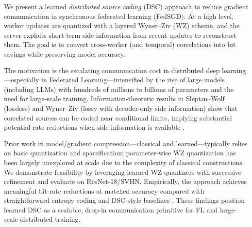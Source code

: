We present a learned \emph{distributed source coding} (DSC) approach to reduce gradient communication in synchronous federated learning (FedSGD). At a high level, worker updates are quantized with a layered Wyner–Ziv (WZ) scheme, and the server exploits short-term side information from recent updates to reconstruct them. The goal is to convert cross-worker (and temporal) correlations into bit savings while preserving model accuracy.

The motivation is the escalating communication cost in distributed deep learning—especially in Federated Learning—intensified by the rise of large models (including LLMs) with hundreds of millions to billions of parameters and the need for large-scale training. Information-theoretic results in Slepian–Wolf (lossless) and Wyner–Ziv (lossy with decoder-only side information) show that correlated sources can be coded near conditional limits, implying substantial potential rate reductions when side information is available \cite{SlepianWolf1973,Yang2008Multiterminal}.

Prior work in model/gradient compression—classical and learned—typically relies on basic quantization and sparsification; parameter-wise WZ quantization has been largely unexplored at scale due to the complexity of classical constructions. We demonstrate feasibility by leveraging learned WZ quantizers with successive refinement \cite{JoukovskyLayeredWZ,OzyilkanRecoverBinning} and evaluate on ResNet-18/SVHN. Empirically, the approach achieves meaningful bit-rate reductions at matched accuracy compared with straightforward entropy coding and DSC-style baselines \cite{Abrahamyan2022LGC,ZhangTao2022}. These findings position learned DSC as a scalable, drop-in communication primitive for FL and large-scale distributed training.
